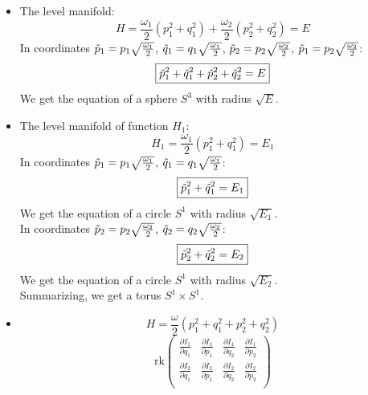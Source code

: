 \documentclass[12pt]{article}
\theoremstyle{definition}
\begin{document}
\begin{enumerate}
\begin{itemize}
        \item The level manifold:
        \begin{equation}
            H=\frac{\omega_1}{2}(p_1^2+q_1^2)+\frac{\omega_2}{2}(p_2^2+q_2^2)=E
        \end{equation}
        In coordinates $\Tilde{p}_1=p_1\sqrt{\frac{\omega_1}{2}}$, $\Tilde{q}_1=q_1\sqrt{\frac{\omega_1}{2}}$, $\Tilde{p}_2=p_2\sqrt{\frac{\omega_2}{2}}$, $\Tilde{p}_1=p_2\sqrt{\frac{\omega_2}{2}}$:
        \begin{equation}
            \boxed{\Tilde{p}_1^2+\Tilde{q}_1^2+\Tilde{p}_2^2+\Tilde{q}_2^2=E}
        \end{equation}
        We get the equation of a sphere $S^3$ with radius $\sqrt{E}$.
        \item The level manifold of function $H_1$:
        \begin{equation}
            H_1=\frac{\omega_1}{2}(p_1^2+q_1^2)=E_1
        \end{equation}
        In coordinates $\Tilde{p}_1=p_1\sqrt{\frac{\omega_1}{2}}$, $\Tilde{q}_1=q_1\sqrt{\frac{\omega_1}{2}}$:
        \begin{equation}
            \boxed{\Tilde{p}_1^2+\Tilde{q}_1^2=E_1}
        \end{equation}
        We get the equation of a circle $S^1$ with radius $\sqrt{E_1}$.\\
        In coordinates $\Tilde{p}_2=p_2\sqrt{\frac{\omega_2}{2}}$, $\Tilde{q}_2=q_2\sqrt{\frac{\omega_2}{2}}$:
        \begin{equation}
            \boxed{\Tilde{p}_2^2+\Tilde{q}_2^2=E_2}
        \end{equation}
        We get the equation of a circle $S^1$ with radius $\sqrt{E_2}$.\\
        Summarizing, we get a torus $S^1\times S^1$.
        \item 
        \begin{equation}
            H=\frac{\omega}{2}(p_1^2+q_1^2+p_2^2+q_2^2)
        \end{equation}
        \begin{equation}
            \text{rk}\begin{pmatrix}
                \frac{\partial I_1}{\partial q_1} & \frac{\partial I_1}{\partial p_1} & \frac{\partial I_1}{\partial q_2} & \frac{\partial I_1}{\partial p_2}\\
                \frac{\partial I_2}{\partial q_1} & \frac{\partial I_2}{\partial p_1} & \frac{\partial I_2}{\partial q_2} & \frac{\partial I_2}{\partial p_2}\\

\end{pmatrix}
\end{equation}
\end{itemize}
\end{enumerate}
\end{document}
